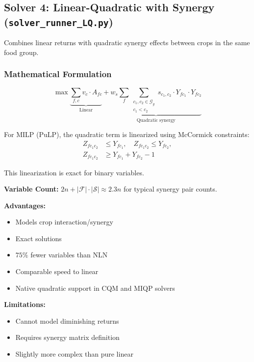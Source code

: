 \documentclass[11pt,a4paper]{article}
\begin{document}
\subsection{Solver 4: Linear-Quadratic with Synergy (\texttt{solver\_runner\_LQ.py})}

Combines linear returns with quadratic synergy effects between crops in the same food group.

\subsubsection{Mathematical Formulation}

\begin{equation}
\max \underbrace{\sum_{f,c} v_c \cdot A_{fc}}_{\text{Linear}} + \underbrace{w_s \sum_f \sum_{\substack{c_1,c_2 \in \mathcal{G}_g \\ c_1 < c_2}} s_{c_1,c_2} \cdot Y_{fc_1} \cdot Y_{fc_2}}_{\text{Quadratic synergy}}
\end{equation}

For MILP (PuLP), the quadratic term is linearized using McCormick constraints:
\begin{align}
Z_{fc_1c_2} &\leq Y_{fc_1}, \quad Z_{fc_1c_2} \leq Y_{fc_2}, \\
Z_{fc_1c_2} &\geq Y_{fc_1} + Y_{fc_2} - 1
\end{align}

This linearization is exact for binary variables.

\textbf{Variable Count:} $2n + |\mathcal{F}| \cdot |\mathcal{S}| \approx 2.3n$ for typical synergy pair counts.

\textbf{Advantages:}
\begin{itemize}
    \item Models crop interaction/synergy
    \item Exact solutions
    \item $75\%$ fewer variables than NLN
    \item Comparable speed to linear
    \item Native quadratic support in CQM and MIQP solvers
\end{itemize}

\textbf{Limitations:}
\begin{itemize}
    \item Cannot model diminishing returns
    \item Requires synergy matrix definition
    \item Slightly more complex than pure linear
\end{itemize}
\end{document}
